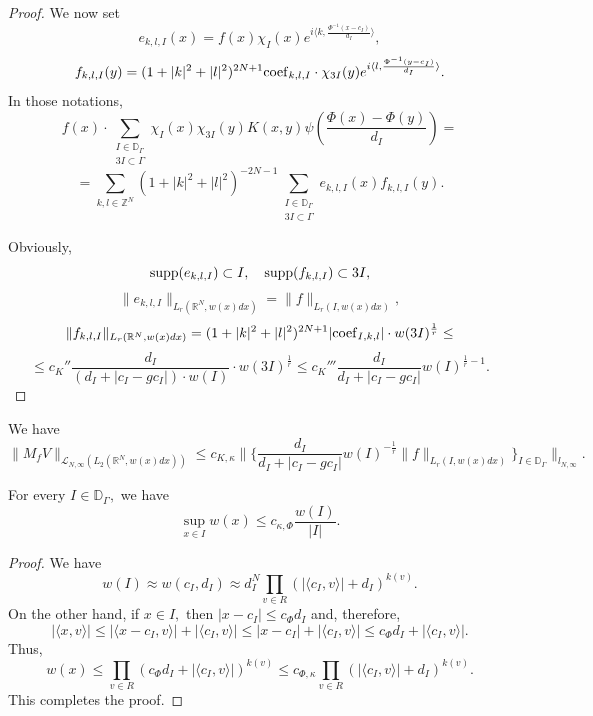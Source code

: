 \documentclass{amsart}
\numberwithin{equation}{section}
\begin{document}
\begin{proof}
We now set
$$e_{k,l,I}(x)=f(x)\chi_I(x)e^{i\langle k,\frac{\Phi^{-1}(x-c_I)}{d_I}\rangle},$$
$$f_{k,l,I}(y)=(1+|k|^2+|l|^2)^{2N+1}{\rm coef}_{k,l,I}\cdot \chi_{3I}(y)e^{i\langle l,\frac{\Phi^{-1}(y-c_I)}{d_I}\rangle}.$$
In those notations,
$$f(x)\cdot\sum_{\substack{I\in\mathbb{D}_{\Gamma}\\ 3I\subset\Gamma}}\chi_I(x)\chi_{3I}(y)K(x,y)\psi(\frac{\Phi(x)-\Phi(y)}{d_I})=$$
$$=\sum_{k,l\in\mathbb{Z}^N}(1+|k|^2+|l|^2)^{-2N-1}\sum_{\substack{I\in\mathbb{D}_{\Gamma}\\ 3I\subset\Gamma}}e_{k,l,I}(x)f_{k,l,I}(y).$$

Obviously,
$${\rm supp}(e_{k,l,I})\subset I,\quad {\rm supp}(f_{k,l,I})\subset 3I,$$
$$\|e_{k,l,I}\|_{L_r(\mathbb{R}^N,w(x)dx)}=\|f\|_{L_r(I,w(x)dx)},$$
$$\|f_{k,l,I}\|_{L_r(\mathbb{R}^N,w(x)dx)}=(1+|k|^2+|l|^2)^{2N+1}|{\rm coef}_{I,k,l}|\cdot w(3I)^{\frac1r}\leq$$
$$\leq c_K''\frac{d_I}{(d_I+|c_I-gc_I|)\cdot w(I)}\cdot w(3I)^{\frac1r}\leq c_K'''\frac{d_I}{d_I+|c_I-gc_I|}w(I)^{\frac1r-1}.$$
\end{proof}

\begin{lemma}\label{intermediate cwikel estimate} We have
$$\|M_fV\|_{\mathcal{L}_{N,\infty}(L_2(\mathbb{R}^N,w(x)dx))}\leq c_{K,\kappa}\Big\|\Big\{\frac{d_I}{d_I+|c_I-gc_I|}w(I)^{-\frac1r}\|f\|_{L_r(I,w(x)dx)}\Big\}_{I\in\mathbb{D}_{\Gamma}}\Big\|_{l_{N,\infty}}.$$
\end{lemma}

\begin{lemma}\label{supremum vs average} For every $I\in\mathbb{D}_{\Gamma},$ we have
$$\sup_{x\in I}w(x)\leq c_{\kappa,\Phi}\frac{w(I)}{|I|}.$$
\end{lemma}
\begin{proof} We have
$$w(I)\approx w(c_I,d_I)\approx d_I^N\prod_{v\in R}(|\langle c_I,v\rangle|+d_I)^{k(v)}.$$
On the other hand, if $x\in I,$ then $|x-c_I|\leq c_{\Phi}d_I$ and, therefore,
$$|\langle x,v\rangle|\leq |\langle x-c_I,v\rangle|+|\langle c_I,v\rangle|\leq |x-c_I|+|\langle c_I,v\rangle|\leq c_{\Phi}d_I+|\langle c_I,v\rangle|.$$
Thus,
$$w(x)\leq \prod_{v\in R}(c_{\Phi}d_I+|\langle c_I,v\rangle|)^{k(v)}\leq c_{\Phi,\kappa}\prod_{v\in R}(|\langle c_I,v\rangle|+d_I)^{k(v)}.$$
This completes the proof.
\end{proof}
\end{document}
